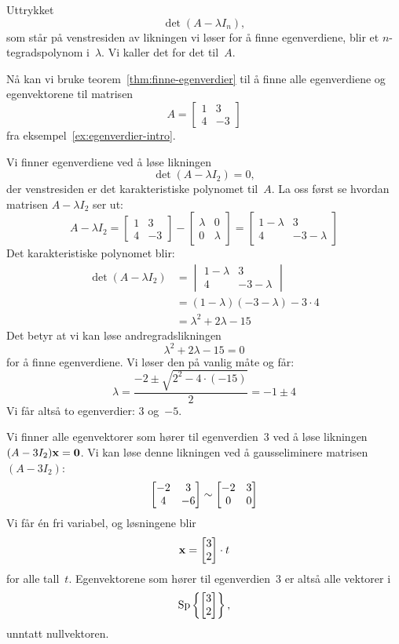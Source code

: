 Uttrykket
\[
\det (A - \lambda I_n),
\]
som står på venstresiden av likningen vi løser for å finne
egenverdiene, blir et $n$-tegradspolynom i~$\lambda$.  Vi kaller det
for det  til~$A$.

\begin{ex}
\label{ex:finne-egenverdier}
Nå kan vi bruke teorem~\ref{thm:finne-egenverdier} til å finne alle
egenverdiene og egenvektorene til matrisen
\[
A = \begin{bmatrix}
1 &  3 \\
4 & -3
\end{bmatrix}
\]
fra eksempel~\ref{ex:egenverdier-intro}.

Vi finner egenverdiene ved å løse likningen
\[
\det (A - \lambda I_2) = 0,
\]
der venstresiden er det karakteristiske polynomet til~$A$.  La oss
først se hvordan matrisen $A - \lambda I_2$ ser ut:
\[
A - \lambda I_2
=
\begin{bmatrix}
1 &  3 \\
4 & -3
\end{bmatrix}
-
\begin{bmatrix}
\lambda &       0 \\
      0 & \lambda
\end{bmatrix}
=
\begin{bmatrix}
1 - \lambda &  3           \\
4           & -3 - \lambda
\end{bmatrix}
\]
Det karakteristiske polynomet blir:
\begin{align*}
\det (A - \lambda I_2)
&=
\begin{vmatrix}
1 - \lambda &  3           \\
4           & -3 - \lambda
\end{vmatrix}
\\
&= (1 - \lambda)(-3 - \lambda) - 3 \cdot 4 \\
&= \lambda^2 + 2\lambda - 15
\end{align*}
Det betyr at vi kan løse andregradslikningen
\[
\lambda^2 + 2\lambda - 15 = 0
\]
for å finne egenverdiene.  Vi løser den på vanlig måte og får:
\[
\lambda
 = \frac{-2 \pm \sqrt{2^2 - 4 \cdot (-15)}}{2}
 = -1 \pm 4
\]
Vi får altså to egenverdier: $3$ og~$-5$.

Vi finner alle egenvektorer som hører til egenverdien~$3$ ved å løse
likningen $(A - 3I_2) \mathbf{x} = \mathbf{0}$.  Vi kan løse denne likningen ved
å gausseliminere matrisen $(A - 3I_2)$:
\[
\begin{bmatrix}
-2 &  3 \\
 4 & -6
\end{bmatrix}
\sim
\begin{bmatrix}
-2 & 3 \\
 0 & 0
\end{bmatrix}
\]
Vi får én fri variabel, og løsningene blir
\[
\mathbf{x} = \begin{bmatrix} 3 \\ 2 \end{bmatrix} \cdot t
\]
for alle tall~$t$.  Egenvektorene som hører til egenverdien~$3$ er
altså alle vektorer i
\[
\operatorname{Sp} \left\{ \begin{bmatrix} 3 \\ 2 \end{bmatrix} \right\},
\]
unntatt nullvektoren.


\end{ex}
